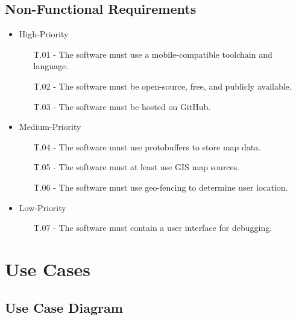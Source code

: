 \documentclass{scrreprt}
\begin{document}
	\section{Non-Functional Requirements}
		\begin{itemize}
		\item High-Priority
		\begin{itemize}
			\item[T.01 -] The software must use a mobile-compatible toolchain and language.
			\item[T.02 -] The software must be open-source, free, and publicly available.
			\item[T.03 -] The software must be hosted on GitHub.
			
		\end{itemize}
		
		\item Medium-Priority
		\begin{itemize}
			\item[T.04 -] The software must use protobuffers to store map data.
			\item[T.05 -] The software must at least use GIS map sources.
			\item[T.06 -] The software must use geo-fencing to determine user location.
		\end{itemize}
		
		\item Low-Priority
		\begin{itemize}
			\item[T.07 -] The software must contain a user interface for debugging.
		\end{itemize}
	\end{itemize}

\chapter{Use Cases}

	\section{Use Case Diagram}
	
\end{document}
